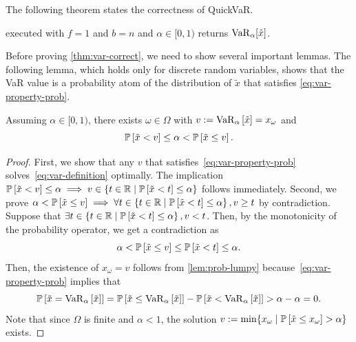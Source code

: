 The following theorem states the correctness of QuickVaR.
\begin{theorem} \label{thm:var-correct}
 executed with $f = 1$ and $b = n$ and $\alpha\in [0,1)$ returns $\varo_{\alpha}[ \tilde{x} ]$.
\end{theorem}

Before proving \cref{thm:var-correct}, we need to show several important lemmas. The following lemma, which holds only for discrete random variables, shows that the VaR value is a probability atom of the distribution of $\tilde{x}$ that satisfies \eqref{eq:var-property-prob}.
\begin{lemma}\label{thm:quantile-in-finite-omega}
Assuming $\alpha\in [0,1)$, there exists $\omega\in\Omega$ with $v := \var{\alpha }{\tilde{x}} = x_{\omega}$ and
\begin{equation} \label{eq:var-property-prob}
  \P{\tilde{x} < v} \le \alpha < \P{\tilde{x} \le v}. 
\end{equation}
\end{lemma}
\begin{proof}
First, we show that any $v$ that satisfies~\eqref{eq:var-property-prob} solves~\eqref{eq:var-definition} optimally. The implication $\P{\tilde{x} < v} \le \alpha \implies v \in \left\{ t \in \Real \mid  \P{ \tilde{x} < t } \le \alpha \right\}$ follows immediately. Second, we prove $\alpha < \P{ \tilde{x} \le v } \implies \forall t \in \left\{ t \in \Real \mid  \P{ \tilde{x} < t } \le \alpha \right\}, v \ge t$ by contradiction. Suppose that $\exists t \in \left\{ t \in \Real \mid  \P{ \tilde{x} < t } \le \alpha \right\}, v < t$. Then, by the monotonicity of the probability operator, we get a contradiction as
 \[
   \alpha
   < \P {  \tilde{x} \le v  }
   \le \P {  \tilde{x} < t  }
   \le \alpha.
 \]
Then, the existence of $x_{\omega} = v$ follows from \cref{lem:prob-lumpy} because~\eqref{eq:var-property-prob} implies that 
  \[
    \P{\tilde{x} =
      \var{\alpha }{\tilde{x}}} = \P{\tilde{x} \le \var{\alpha }{\tilde{x}}}  - \P{\tilde{x} < \var{\alpha }{\tilde{x}}} > \alpha - \alpha = 0.
  \]
Note that since $\Omega$ is finite and $\alpha<1$, the solution $v := \min\{x_\omega \mid \P{\tilde{x} \le x_\omega} > \alpha\}$ exists.
\end{proof}

